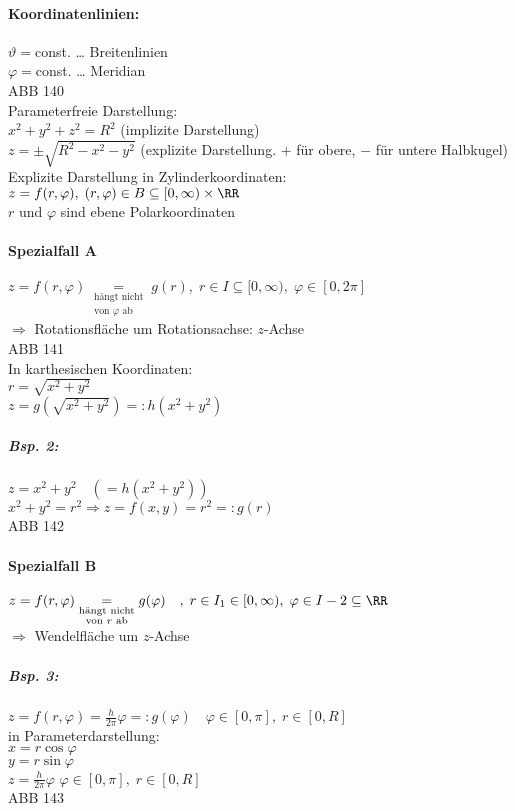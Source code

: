 \paragraph{Koordinatenlinien:}\parskp
$\vartheta =$const. … Breitenlinien\\
$\varphi =$const. … Meridian\\
ABB 140\\
Parameterfreie Darstellung:\\
$x^2+y^2+z^2=R^2$ (implizite Darstellung)\\
$z=\pm\sqrt{R^2-x^2-y^2}$ (explizite Darstellung. $+$ für obere, $-$ für untere Halbkugel)\\
Explizite Darstellung in Zylinderkoordinaten:\\
$z=f(r,\varphi), \; (r,\varphi) \in B \subseteq [0,\infty) \times \RR$\\
$r$ und $\varphi$ sind ebene Polarkoordinaten
\paragraph{Spezialfall A} $z=f(r,\varphi)\underset{\substack{\text{hängt nicht}\\\text{von }\varphi\text{ ab}}}{=} g(r), \; r\in I\subseteq [0,\infty), \; \varphi \in [0,2\pi]$\\
$\Rightarrow$ Rotationsfläche um Rotationsachse: $z$-Achse\\
ABB 141\\
In karthesischen Koordinaten:\\
$r=\sqrt{x^2+y^2}$\\
$z=g\left(\sqrt{x^2+y^2}\right) =: h(x^2+y^2)$
\subparagraph{Bsp. 2:} $z=x^2+y^2 \quad (=h(x^2+y^2))$\\
$x^2+y^2=r^2\Rightarrow z = f(x,y) = r^2 =: g(r)$\\
ABB 142
\paragraph{Spezialfall B} $z=f(r,\varphi)\underset{\substack{\text{hängt nicht}\\\text{von }r\text{ ab}}}{=}g(\varphi)\quad ,\;r\in I_1\in[0,\infty), \; \varphi \in I-2 \subseteq \RR$\\
$\Rightarrow$ Wendelfläche um $z$-Achse
\subparagraph{Bsp. 3:} $z=f(r,\varphi) = \frac{h}{2\pi}\varphi =: g(\varphi) \quad \varphi\in [0,\pi], \; r \in [0,R]$\\
in Parameterdarstellung:\\
$x=r\cos \varphi$\\
$y=r\sin \varphi$\\
$z=\frac{h}{2\pi}\varphi$ \quad $\varphi \in [0,\pi], \; r \in [0,R]$\\
ABB 143

